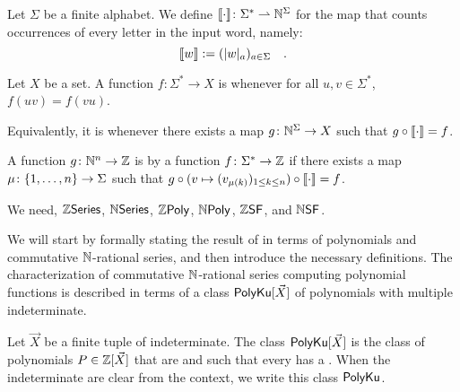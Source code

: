 \documentclass[sigconf,natbib=false,screen, review,anonymous]{acmart}
\begin{document}
\begin{definition}
    \label{commutative-map:def}
    Let $\Sigma$ be a finite alphabet. We define
    $\commute \colon \Sigma^* \topartial \Nat^\Sigma$ for the
    map that counts occurrences of every letter in the input word, namely:
    \begin{equation*}
        \commute[w] \defined \seqof{\card[a]{w}}{a \in \Sigma} \quad .
    \end{equation*}
\end{definition}

\begin{definition}
    \label{commutative:def}
    Let $X$ be a set.
    A function $f \colon \Sigma^* \to X$ is
     whenever
    for all $u,v \in \Sigma^*$, $f(uv) = f(vu)$.

    Equivalently, it is  whenever
    there exists a map $g \colon \mathbb{N}^\Sigma \to X$
    such that $g \circ \commute = f$.
\end{definition}


\begin{definition}
    A function $g \colon \mathbb{N}^n \to \mathbb{Z}$
    is  by a function $f \colon \Sigma^* \to \mathbb{Z}$
    if there exists a map $\mu \colon \mathopen{\{} 1, \dots, n \mathclose{\}} \to \Sigma$
    such that
    $g \circ (v \mapsto \seqof{v_{\mu(k)}}{1 \leq k \leq n}) \circ \commute = f$.
\end{definition}



We need, $\mathbb{Z}\mathsf{Series}$, $\mathbb{N}\mathsf{Series}$, $\ZPoly$, $\NPoly$, $\ZSF$, and $\NSF$.


We will start by formally stating the result of \citeauthor{KARH77}
in terms of polynomials and commutative $\mathbb{N}$-rational series, and
then introduce the necessary definitions. The characterization of
commutative $\mathbb{N}$-rational series computing polynomial functions
is described in terms of a class $\mathsf{PolyKu}[\vec{X}]$ of
polynomials with multiple indeterminate.

\begin{definition}
    Let $\vec{X}$ be a finite tuple of indeterminate.
    The class $\mathsf{PolyKu}[\vec{X}]$
    is the class of polynomials $P \in \mathbb{Z}[\vec{X}]$
    that are 
    and such that every  has a .
    When the indeterminate are clear from the context, we write
    this class $\mathsf{PolyKu}$.
\end{definition}
\end{document}
